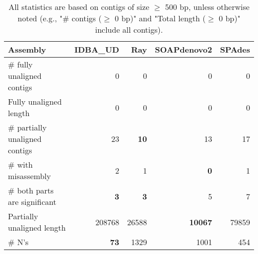 \documentclass[12pt,a4paper]{article}
\begin{document}
\begin{table}[ht]
\begin{center}
\caption{All statistics are based on contigs of size $\geq$ 500 bp, unless otherwise noted (e.g., "\# contigs ($\geq$ 0 bp)" and "Total length ($\geq$ 0 bp)" include all contigs).}
\begin{tabular}{|l*{4}{|r}|}
\hline
Assembly & IDBA\_UD & Ray & SOAPdenovo2 & SPAdes \\ \hline
\# fully unaligned contigs & 0 & 0 & 0 & 0 \\ \hline
Fully unaligned length & 0 & 0 & 0 & 0 \\ \hline
\# partially unaligned contigs & 23 & {\bf 10} & 13 & 17 \\ \hline
\hspace{5mm}\# with misassembly & 2 & 1 & {\bf 0} & 1 \\ \hline
\hspace{5mm}\# both parts are significant & {\bf 3} & {\bf 3} & 5 & 7 \\ \hline
Partially unaligned length & 208768 & 26588 & {\bf 10067} & 79859 \\ \hline
\# N's & {\bf 73} & 1329 & 1001 & 454 \\ \hline
\end{tabular}
\end{center}
\end{table}
\end{document}
